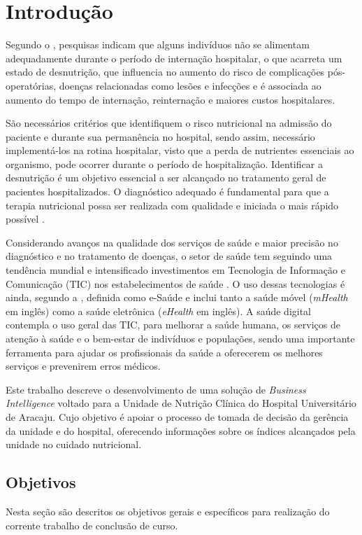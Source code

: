 \chapter{Introdução}
Segundo o , pesquisas indicam que alguns indivíduos não se alimentam adequadamente durante o período de internação hospitalar, o que acarreta um estado de desnutrição, que influencia no aumento do risco de complicações pós-operatórias, doenças relacionadas como lesões e infecções e é associada ao aumento do tempo de internação, reinternação e maiores custos hospitalares.

São necessários critérios que identifiquem o risco nutricional na admissão do paciente e durante sua permanência no hospital, sendo assim, necessário implementá-los na rotina hospitalar, visto que a perda de nutrientes essenciais ao organismo, pode ocorrer durante o período de hospitalização. Identificar a desnutrição é um objetivo essencial a ser alcançado no tratamento geral de pacientes hospitalizados. O diagnóstico adequado é fundamental para que a terapia nutricional possa ser realizada com qualidade e iniciada o mais rápido possível \cite{keller2014}.

Considerando avanços na qualidade dos serviços de saúde e maior precisão no diagnóstico e no tratamento de doenças, o setor de saúde tem seguindo uma tendência mundial e intensificado investimentos em Tecnologia de Informação e Comunicação (TIC) nos estabelecimentos de saúde \cite{saudedigital2019}. O uso dessas tecnologias é ainda, segundo a , definida como e-Saúde e inclui tanto a saúde móvel (\textit{mHealth} em inglês) como a saúde eletrônica (\textit{eHealth} em inglês). A saúde digital contempla o uso geral das TIC, para melhorar a saúde humana, os serviços de atenção à saúde e o bem-estar de indivíduos e populações, sendo uma importante ferramenta para ajudar os profissionais da saúde a oferecerem os melhores serviços e prevenirem erros médicos.

Este trabalho descreve o desenvolvimento de uma solução de \textit{Business Intelligence} voltado para a Unidade de Nutrição Clínica do Hospital Universitário de Aracaju. Cujo objetivo é apoiar o processo de tomada de decisão da gerência da unidade e do hospital, oferecendo informações sobre os índices alcançados pela unidade no cuidado nutricional.  


\section{Objetivos}\label{sec-divisoes}
Nesta seção são descritos os objetivos gerais e específicos para realização do corrente trabalho de conclusão de curso.


